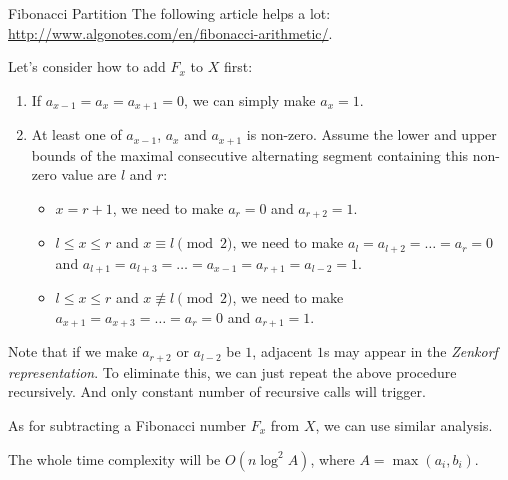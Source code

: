 \begin{tutorial}{Fibonacci Partition}
The following article helps a lot: \url{http://www.algonotes.com/en/fibonacci-arithmetic/}.

Let's consider how to add $F_x$ to $X$ first:

\begin{enumerate}
\item If $a_{x-1} = a_{x} = a_{x+1} = 0$, we can simply make $a_x=1$.
\item At least one of $a_{x-1}$, $a_{x}$ and $a_{x+1}$ is non-zero. Assume the lower and upper bounds of the maximal consecutive alternating segment containing this non-zero value are $l$ and $r$:
\begin{itemize}
   \item $x=r+1$, we need to make $a_r=0$ and $a_{r+2}=1$.
   \item $l \le x \le r$ and $x \equiv l \pmod 2$, we need to make $a_l=a_{l+2}=\ldots=a_r=0$ and $a_{l+1}=a_{l+3}=\ldots=a_{x-1}=a_{r+1}=a_{l-2}=1$.
   \item $l \le x \le r$ and $x \not \equiv l \pmod 2$, we need to make $a_{x+1}=a_{x+3}=\ldots=a_r=0$ and $a_{r+1}=1$.
\end{itemize}
\end{enumerate}

Note that if we make $a_{r+2}$ or $a_{l-2}$ be $1$, adjacent $1$s may appear in the \textit{Zenkorf representation}. To eliminate this, we can just repeat the above procedure recursively. And only constant number of recursive calls will trigger.

As for subtracting a Fibonacci number $F_x$ from $X$, we can use similar analysis.

The whole time complexity will be $O(n \log^2 A)$, where $A=\max(a_i,b_i)$.

\end{tutorial}
